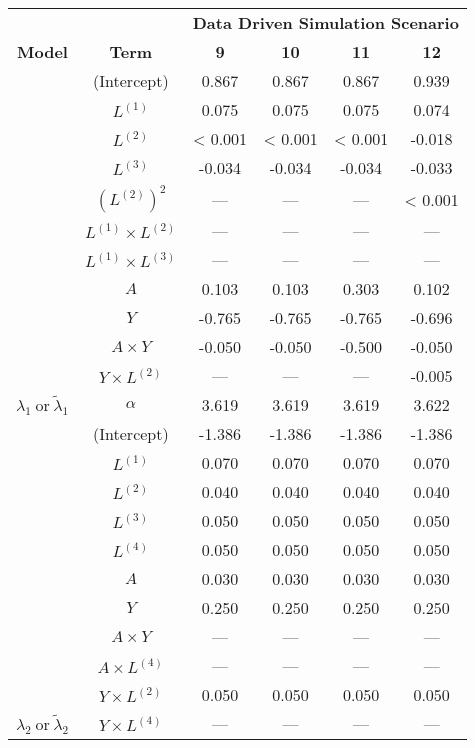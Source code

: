 \begin{sidewaystable}
\begin{minipage}[t]{0.5\textwidth}
\begin{tabular}[t]{>{}ccccc>{}c}
\hline
\multicolumn{1}{c}{\textbf{ }} & \multicolumn{1}{c}{\textbf{ }} & \multicolumn{4}{c}{\textbf{Data Driven Simulation Scenario}} \\
\cmidrule{3-6}
\textbf{Model} & \textbf{Term} & \textbf{9} & \textbf{10} & \textbf{11} & \textbf{12}\\
\hline
 & (Intercept) & 0.867 & 0.867 & 0.867 & 0.939\\
\cmidrule{2-6}
 & $L^{(1)}$ & 0.075 & 0.075 & 0.075 & 0.074\\
\cmidrule{2-6}
 & $L^{(2)}$ & < 0.001 & < 0.001 & < 0.001 & -0.018\\
\cmidrule{2-6}
 & $L^{(3)}$ & -0.034 & -0.034 & -0.034 & -0.033\\
\cmidrule{2-6}
 & $(L^{(2)})^2$ & --- & --- & --- & < 0.001\\
\cmidrule{2-6}
 & $L^{(1)} \times L^{(2)}$ & --- & --- & --- & ---\\
\cmidrule{2-6}
 & $L^{(1)} \times L^{(3)}$ & --- & --- & --- & ---\\
\cmidrule{2-6}
 & $A$ & 0.103 & 0.103 & 0.303 & 0.102\\
\cmidrule{2-6}
 & $Y$ & -0.765 & -0.765 & -0.765 & -0.696\\
\cmidrule{2-6}
 & $A\times Y$ & -0.050 & -0.050 & -0.500 & -0.050\\
\cmidrule{2-6}
 & $Y \times L^{(2)}$ & --- & --- & --- & -0.005\\
\cmidrule{2-6}
\multirow{-12}{*}{\centering\arraybackslash $\lambda_1~\text{or}~\tilde\lambda_1$} & $\alpha$ & 3.619 & 3.619 & 3.619 & 3.622\\
\cmidrule{1-6}
 & (Intercept) & -1.386 & -1.386 & -1.386 & -1.386\\
\cmidrule{2-6}
 & $L^{(1)}$ & 0.070 & 0.070 & 0.070 & 0.070\\
\cmidrule{2-6}
 & $L^{(2)}$ & 0.040 & 0.040 & 0.040 & 0.040\\
\cmidrule{2-6}
 & $L^{(3)}$ & 0.050 & 0.050 & 0.050 & 0.050\\
\cmidrule{2-6}
 & $L^{(4)}$ & 0.050 & 0.050 & 0.050 & 0.050\\
\cmidrule{2-6}
 & $A$ & 0.030 & 0.030 & 0.030 & 0.030\\
\cmidrule{2-6}
 & $Y$ & 0.250 & 0.250 & 0.250 & 0.250\\
\cmidrule{2-6}
 & $A\times Y$ & --- & --- & --- & ---\\
\cmidrule{2-6}
 & $A \times L^{(4)}$ & --- & --- & --- & ---\\
\cmidrule{2-6}
 & $Y \times L^{(2)}$ & 0.050 & 0.050 & 0.050 & 0.050\\
\cmidrule{2-6}
\multirow{-11}{*}{\centering\arraybackslash $\lambda_2~\text{or}~\tilde\lambda_2$} & $Y \times L^{(4)}$ & --- & --- & --- & ---\\
\hline
\end{tabular}
\end{minipage}
\end{sidewaystable}



